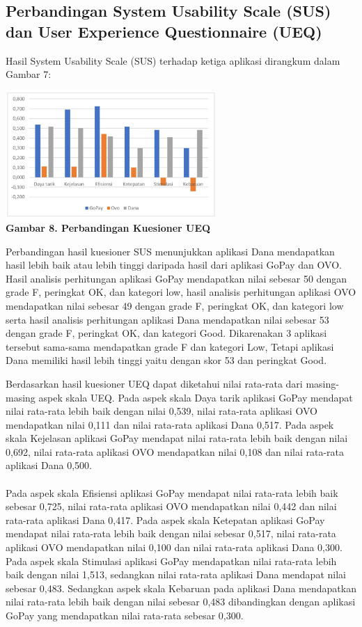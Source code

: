\documentclass[
 manuscript=article,  %
  layout=publish, 
  year=2024, 
  month= Februari, %
  volume=8,
  number=1 
]{JIKO}
\begin{document}
\subsection{Perbandingan System Usability Scale (SUS) dan User Experience Questionnaire (UEQ)}
Hasil System Usability Scale (SUS) terhadap ketiga aplikasi dirangkum dalam Gambar 7: 
\begin{center}
    \includegraphics[width=0.6\textwidth]{assets/gambar8.jpg}
    \\\textbf{Gambar 8. Perbandingan Kuesioner UEQ}
\end{center}


Perbandingan hasil kuesioner SUS menunjukkan aplikasi Dana mendapatkan hasil lebih baik atau lebih tinggi daripada hasil dari aplikasi GoPay dan OVO. Hasil analisis perhitungan aplikasi GoPay mendapatkan nilai sebesar 50 dengan grade F, peringkat OK, dan kategori low, hasil analisis perhitungan aplikasi OVO mendapatkan nilai sebesar 49 dengan grade F, peringkat OK, dan kategori low serta hasil analisis perhitungan aplikasi Dana mendapatkan nilai sebesar 53 dengan grade F, peringkat OK, dan kategori Good. Dikarenakan 3 aplikasi tersebut sama-sama mendapatkan grade F dan kategori Low, Tetapi aplikasi Dana memiliki hasil lebih tinggi yaitu dengan skor 53 dan peringkat Good.

Berdasarkan hasil kuesioner UEQ dapat diketahui nilai rata-rata dari masing-masing aspek skala UEQ. Pada aspek skala Daya tarik aplikasi GoPay mendapat nilai rata-rata lebih baik dengan nilai 0,539, nilai rata-rata aplikasi OVO mendapatkan nilai 0,111 dan nilai rata-rata aplikasi Dana 0,517. Pada aspek skala Kejelasan aplikasi GoPay mendapat nilai rata-rata lebih baik dengan nilai 0,692, nilai rata-rata aplikasi OVO mendapatkan nilai 0,108 dan nilai rata-rata aplikasi Dana 0,500. 
 \\ \\ 
Pada aspek skala Efisiensi aplikasi GoPay mendapat nilai rata-rata lebih baik sebesar 0,725, nilai rata-rata aplikasi OVO mendapatkan nilai 0,442 dan nilai rata-rata aplikasi Dana 0,417. Pada aspek skala Ketepatan aplikasi GoPay mendapat nilai rata-rata lebih baik dengan nilai sebesar 0,517, nilai rata-rata aplikasi OVO mendapatkan nilai 0,100 dan nilai rata-rata aplikasi Dana 0,300. Pada aspek skala Stimulasi aplikasi GoPay mendapatkan nilai rata-rata lebih baik dengan nilai 1,513, sedangkan nilai rata-rata aplikasi Dana mendapat nilai sebesar 0,483. Sedangkan aspek skala Kebaruan pada aplikasi Dana mendapatkan nilai rata-rata lebih baik dengan nilai sebesar 0,483 dibandingkan dengan aplikasi GoPay yang mendapatkan nilai rata-rata sebesar 0,300. 
\end{document}
